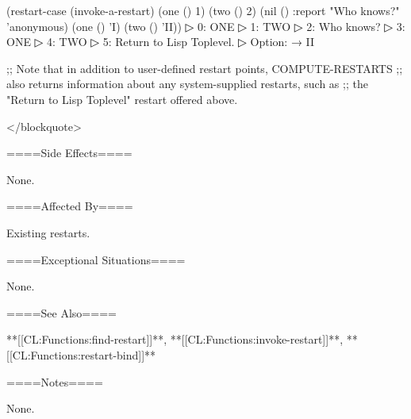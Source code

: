 (restart-case (invoke-a-restart) (one () 1) (two () 2) (nil () :report "Who knows?" 'anonymous) (one () 'I) (two () 'II))
▷ 0: ONE
▷ 1: TWO
▷ 2: Who knows?
▷ 3: ONE
▷ 4: TWO
▷ 5: Return to Lisp Toplevel.
▷ Option:  → II

;; Note that in addition to user-defined restart points, COMPUTE-RESTARTS ;; also returns information about any system-supplied restarts, such as ;; the "Return to Lisp Toplevel" restart offered above.

</blockquote>


====Side Effects====

None.

====Affected By====

Existing restarts.

====Exceptional Situations====

None.

====See Also====

**[[CL:Functions:find-restart]]**, **[[CL:Functions:invoke-restart]]**, **[[CL:Functions:restart-bind]]**

====Notes====

None.

  
